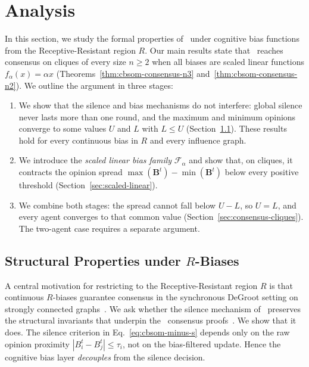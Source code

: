 \section{Analysis}
\label{sec:analysis}

In this section, we study the formal properties of \CBSOMminus\ under
cognitive bias functions from the Receptive-Resistant region $R$.
Our main results state that \CBSOMminus\ reaches consensus on cliques
of every size $n\ge 2$ when all biases are scaled linear functions
$f_\alpha(x)=\alpha x$ (Theorems~\ref{thm:cbsom-consensus-n3}
and~\ref{thm:cbsom-consensus-n2}). We outline the argument in three
stages:
\begin{enumerate}
  \item We show that the silence and bias mechanisms do not interfere:
    global silence never lasts more than one round, and the maximum
    and minimum opinions converge to some values $U$ and $L$ with
    $L\le U$ (Section~\ref{sec:analysis-structure}). These results hold
    for every continuous bias in $R$ and every influence graph.
  \item We introduce the \emph{scaled linear bias family}
    $\mathcal{F}_\alpha$ and show that, on cliques, it contracts the
    opinion spread $\max(\mathbf{B}^t)-\min(\mathbf{B}^t)$ below every
    positive threshold (Section~\ref{sec:scaled-linear}).
  \item We combine both stages: the spread cannot fall below $U-L$, so
    $U=L$, and every agent converges to that common value
    (Section~\ref{sec:consensus-cliques}). The two-agent case requires
    a separate argument.
\end{enumerate}

\subsection{Structural Properties under \texorpdfstring{$R$}{R}-Biases}
\label{sec:analysis-structure}

A central motivation for restricting to the Receptive-Resistant region
$R$ is that continuous $R$-biases guarantee consensus in the synchronous
DeGroot setting on strongly connected graphs~\cite{Alvim2024}. We ask
whether the silence mechanism of \CBSOMminus\ preserves the structural
invariants that underpin the \SOMminus\ consensus
proofs~\cite{aranda2024sound}. We show that it does. The silence
criterion in Eq.~\eqref{eq:cbsom-minus-s} depends only on the raw
opinion proximity $|B_i^t-B_j^t|\le\tau_i$, not on the bias-filtered
update. Hence the cognitive bias layer \emph{decouples} from the
silence decision.

